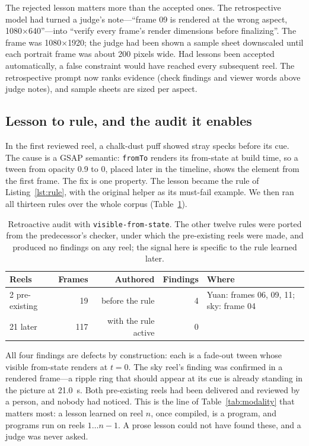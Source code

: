 \documentclass[11pt]{article}
\begin{document}
The rejected lesson matters more than the accepted ones. The retrospective model had turned a judge's
note---``frame 09 is rendered at the wrong aspect, 1080$\times$640''---into ``verify every frame's
render dimensions before finalizing''. The frame was 1080$\times$1920; the judge had been shown a
sample sheet downscaled until each portrait frame was about 200 pixels wide. Had lessons been
accepted automatically, a false constraint would have reached every subsequent reel. The
retrospective prompt now ranks evidence (check findings and viewer words above judge notes), and sample
sheets are sized per aspect.

\subsection{Lesson to rule, and the audit it enables}
\label{sec:audit}
In the first reviewed reel, a chalk-dust puff showed stray specks before its cue. The cause is a GSAP
semantic: \texttt{fromTo} renders its from-state at build time, so a tween from opacity 0.9 to 0,
placed later in the timeline, shows the element from the first frame. The fix is one property. The
lesson became the rule of Listing~\ref{lst:rule}, with the original helper as its must-fail example.
We then ran all thirteen rules over the whole corpus (Table~\ref{tab:audit}).

\begin{table}[t]
\centering\small
\begin{tabular}{lrrrl}
\toprule
Reels & Frames & Authored & Findings & Where \\
\midrule
2 pre-existing & 19 & before the rule & 4 & Yuan: frames 06, 09, 11; sky: frame 04 \\
21 later & 117 & with the rule active & 0 & \\
\bottomrule
\end{tabular}
\caption{Retroactive audit with \texttt{visible-from-state}. The other twelve rules were ported from
the predecessor's checker, under which the pre-existing reels were made, and produced no findings on
any reel; the signal here is specific to the rule learned later.}
\label{tab:audit}
\end{table}

All four findings are defects by construction: each is a fade-out tween whose visible from-state
renders at $t=0$. The sky reel's finding was confirmed in a rendered frame---a ripple ring that should
appear at its cue is already standing in the picture at 21.0~s. Both pre-existing reels had been
delivered and reviewed by a person, and nobody had noticed. This is the line of Table~\ref{tab:modality}
that matters most: a lesson learned on reel $n$, once compiled, is a program, and programs run on reels
$1 \ldots n-1$. A prose lesson could not have found these, and a judge was never asked.
\end{document}

